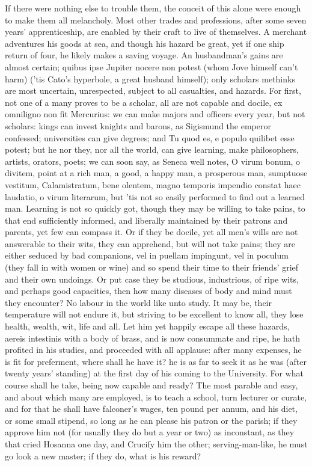 {If there were nothing else to trouble them, the conceit of this alone
were enough to make them all melancholy. Most other trades and
professions, after some seven years' apprenticeship, are enabled by
their craft to live of themselves. A merchant adventures his goods at
sea, and though his hazard be great, yet if one ship return of four, he
likely makes a saving voyage. An husbandman's gains are almost certain;
quibus ipse Jupiter nocere non potest (whom Jove himself can't harm)
('tis Cato's hyperbole, a great husband himself); only scholars
methinks are most uncertain, unrespected, subject to all casualties,
and hazards. For first, not one of a many proves to be a scholar, all
are not capable and docile, ex omniligno non fit Mercurius: we
can make majors and officers every year, but not scholars: kings can
invest knights and barons, as Sigismund the emperor confessed;
universities can give degrees; and Tu quod es, e populo quilibet esse
potest; but he nor they, nor all the world, can give learning, make
philosophers, artists, orators, poets; we can soon say, as Seneca well
notes, O virum bonum, o divitem, point at a rich man, a good, a happy
man, a prosperous man, sumptuose vestitum, Calamistratum, bene olentem,
magno temporis impendio constat haec laudatio, o virum literarum, but
'tis not so easily performed to find out a learned man. Learning is not
so quickly got, though they may be willing to take pains, to that end
sufficiently informed, and liberally maintained by their patrons and
parents, yet few can compass it. Or if they be docile, yet all men's
wills are not answerable to their wits, they can apprehend, but will
not take pains; they are either seduced by bad companions, vel in
puellam impingunt, vel in poculum (they fall in with women or wine) and
so spend their time to their friends' grief and their own undoings. Or
put case they be studious, industrious, of ripe wits, and perhaps good
capacities, then how many diseases of body and mind must they
encounter? No labour in the world like unto study. It may be, their
temperature will not endure it, but striving to be excellent to know
all, they lose health, wealth, wit, life and all. Let him yet happily
escape all these hazards, aereis intestinis with a body of brass, and
is now consummate and ripe, he hath profited in his studies, and
proceeded with all applause: after many expenses, he is fit for
preferment, where shall he have it? he is as far to seek it as he was
(after twenty years' standing) at the first day of his coming to the
University. For what course shall he take, being now capable and ready?
The most parable and easy, and about which many are employed, is to
teach a school, turn lecturer or curate, and for that he shall have
falconer's wages, ten pound per annum, and his diet, or some small
stipend, so long as he can please his patron or the parish; if they
approve him not (for usually they do but a year or two) as inconstant,
as they that cried Hosanna one day, and Crucify him the other;
serving-man-like, he must go look a new master; if they do, what is his
reward?

}
